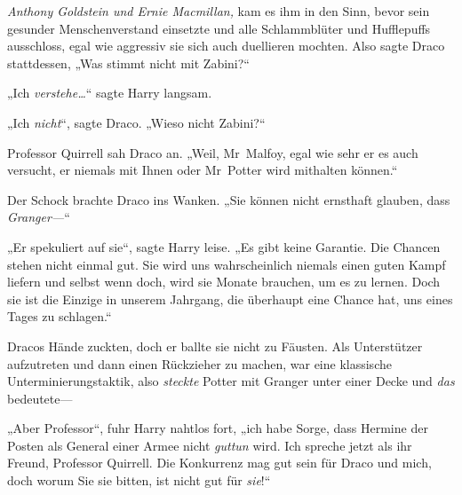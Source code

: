 \emph{Anthony Goldstein und Ernie Macmillan,} kam es ihm in den Sinn, bevor sein gesunder Menschenverstand einsetzte und alle Schlammblüter und Hufflepuffs ausschloss, egal wie aggressiv sie sich auch duellieren mochten. Also sagte Draco stattdessen, „Was stimmt nicht mit Zabini?“

„Ich \emph{verstehe…}“ sagte Harry langsam.

„Ich \emph{nicht}“, sagte Draco. „Wieso nicht Zabini?“

Professor Quirrell sah Draco an. „Weil, Mr~Malfoy, egal wie sehr er es auch versucht, er niemals mit Ihnen oder Mr~Potter wird mithalten können.“

Der Schock brachte Draco ins Wanken. „Sie können nicht ernsthaft glauben, dass \emph{Granger—}“

„Er spekuliert auf sie“, sagte Harry leise. „Es gibt keine Garantie. Die Chancen stehen nicht einmal gut. Sie wird uns wahrscheinlich niemals einen guten Kampf liefern und selbst wenn doch, wird sie Monate brauchen, um es zu lernen. Doch sie ist die Einzige in unserem Jahrgang, die überhaupt eine Chance hat, uns eines Tages zu schlagen.“

Dracos Hände zuckten, doch er ballte sie nicht zu Fäusten. Als Unterstützer aufzutreten und dann einen Rückzieher zu machen, war eine klassische Unterminierungstaktik, also \emph{steckte} Potter mit Granger unter einer Decke und \emph{das} bedeutete—

„Aber Professor“, fuhr Harry nahtlos fort, „ich habe Sorge, dass Hermine der Posten als General einer Armee nicht \emph{guttun} wird. Ich spreche jetzt als ihr Freund, Professor Quirrell. Die Konkurrenz mag gut sein für Draco und mich, doch worum Sie sie bitten, ist nicht gut für \emph{sie}!“

